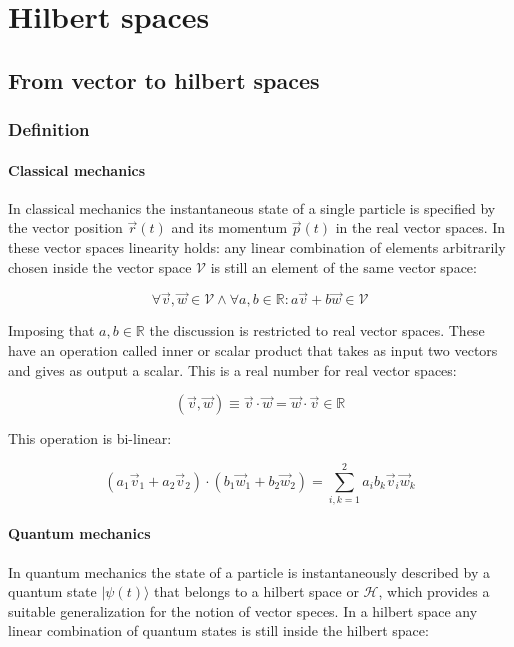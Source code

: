\chapter{Hilbert spaces}

\section{From vector to hilbert spaces}

	\subsection{Definition}

		\subsubsection{Classical mechanics}
		In classical mechanics the instantaneous state of a single particle is specified by the vector position $\vec{r}(t)$ and its momentum $\vec{p}(t)$ in the real vector spaces.
		In these vector spaces linearity holds: any linear combination of elements arbitrarily chosen inside the vector space $\mathcal{V}$ is still an element of the same vector space:
	
		$$\forall \vec{v}, \vec{w}\in\mathcal{V}\land\forall a, b\in\mathbb{R}: a\vec{v}+b\vec{w}\in\mathcal{V}$$

		Imposing that $a,b\in\mathbb{R}$ the discussion is restricted to real vector spaces.
		These have an operation called inner or scalar product that takes as input two vectors and gives as output a scalar.
		This is a real number for real vector spaces:

		$$(\vec{v}, \vec{w})\equiv \vec{v}\cdot\vec{w} = \vec{w}\cdot\vec{v}\in\mathbb{R}$$

		This operation is bi-linear:

		$$(a_1\vec{v}_1 + a_2\vec{v}_2)\cdot(b_1\vec{w}_1 + b_2\vec{w}_2) = \sum\limits_{i, k=1}^2 a_ib_k\vec{v}_i\vec{w}_k$$

		\subsubsection{Quantum mechanics}
		In quantum mechanics the state of a particle is instantaneously described by a quantum state $|\psi(t)\rangle$ that belongs to a hilbert space or $\mathcal{H}$, which provides a suitable generalization for the notion of vector speces.
		In a hilbert space any linear combination of quantum states is still inside the hilbert space:

